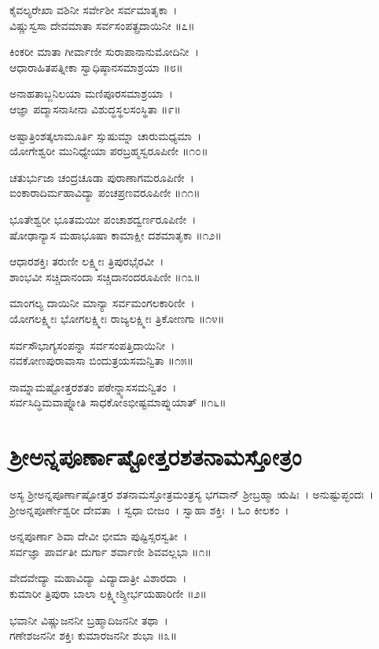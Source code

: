ಕೈವಲ್ಯರೇಖಾ ವಶಿನೀ ಸರ್ವೇಶೀ ಸರ್ವಮಾತೃಕಾ~।\\
ವಿಷ್ಣುಸ್ವಸಾ ದೇವಮಾತಾ ಸರ್ವಸಂಪತ್ಪ್ರದಾಯಿನೀ ॥೭॥

ಕಿಂಕರೀ ಮಾತಾ ಗೀರ್ವಾಣೀ ಸುರಾಪಾನಾನುಮೋದಿನೀ~।\\
ಆಧಾರಾಹಿತಪತ್ನೀಕಾ ಸ್ವಾಧಿಷ್ಠಾನಸಮಾಶ್ರಯಾ ॥೮॥

ಅನಾಹತಾಬ್ಜನಿಲಯಾ ಮಣಿಪೂರಸಮಾಶ್ರಯಾ~।\\
ಆಜ್ಞಾ ಪದ್ಮಾಸನಾಸೀನಾ ವಿಶುದ್ಧಸ್ಥಲಸಂಸ್ಥಿತಾ ॥೯॥

ಅಷ್ಟಾತ್ರಿಂಶತ್ಕಲಾಮೂರ್ತಿ ಸ್ಸುಷುಮ್ನಾ ಚಾರುಮಧ್ಯಮಾ~।\\
ಯೋಗೇಶ್ವರೀ ಮುನಿಧ್ಯೇಯಾ ಪರಬ್ರಹ್ಮಸ್ವರೂಪಿಣೀ ॥೧೦॥

ಚತುರ್ಭುಜಾ ಚಂದ್ರಚೂಡಾ ಪುರಾಣಾಗಮರೂಪಿಣೀ~।\\
ಐಂಕಾರಾದಿರ್ಮಹಾವಿದ್ಯಾ ಪಂಚಪ್ರಣವರೂಪಿಣೀ ॥೧೧॥

ಭೂತೇಶ್ವರೀ ಭೂತಮಯೀ ಪಂಚಾಶದ್ವರ್ಣರೂಪಿಣೀ~।\\
ಷೋಢಾನ್ಯಾಸ ಮಹಾಭೂಷಾ ಕಾಮಾಕ್ಷೀ ದಶಮಾತೃಕಾ ॥೧೨॥

ಆಧಾರಶಕ್ತಿಃ ತರುಣೀ ಲಕ್ಷ್ಮೀಃ ತ್ರಿಪುರಭೈರವೀ~।\\
ಶಾಂಭವೀ ಸಚ್ಚಿದಾನಂದಾ ಸಚ್ಚಿದಾನಂದರೂಪಿಣೀ ॥೧೩॥

ಮಾಂಗಲ್ಯ ದಾಯಿನೀ ಮಾನ್ಯಾ ಸರ್ವಮಂಗಲಕಾರಿಣೀ~।\\
ಯೋಗಲಕ್ಷ್ಮೀಃ ಭೋಗಲಕ್ಷ್ಮೀಃ ರಾಜ್ಯಲಕ್ಷ್ಮೀಃ ತ್ರಿಕೋಣಗಾ ॥೧೪॥

ಸರ್ವಸೌಭಾಗ್ಯಸಂಪನ್ನಾ ಸರ್ವಸಂಪತ್ತಿದಾಯಿನೀ~।\\
ನವಕೋಣಪುರಾವಾಸಾ ಬಿಂದುತ್ರಯಸಮನ್ವಿತಾ ॥೧೫॥

ನಾಮ್ನಾಮಷ್ಟೋತ್ತರಶತಂ ಪಠೇನ್ನ್ಯಾಸಸಮನ್ವಿತಂ~।\\
ಸರ್ವಸಿದ್ಧಿಮವಾಪ್ನೋತಿ ಸಾಧಕೋಽಭೀಷ್ಟಮಾಪ್ನುಯಾತ್ ॥೧೬॥
\section{ಶ್ರೀಅನ್ನಪೂರ್ಣಾಷ್ಟೋತ್ತರಶತನಾಮಸ್ತೋತ್ರಂ }
ಅಸ್ಯ ಶ್ರೀಅನ್ನಪೂರ್ಣಾಷ್ಟೋತ್ತರ ಶತನಾಮಸ್ತೋತ್ರಮಂತ್ರಸ್ಯ ಭಗವಾನ್ ಶ್ರೀಬ್ರಹ್ಮಾ ಋಷಿಃ~। ಅನುಷ್ಟುಪ್ಛಂದಃ~। ಶ್ರೀಅನ್ನಪೂರ್ಣೇಶ್ವರೀ ದೇವತಾ~। ಸ್ವಧಾ ಬೀಜಂ~। ಸ್ವಾಹಾ ಶಕ್ತಿಃ~। ಓಂ ಕೀಲಕಂ~।

ಅನ್ನಪೂರ್ಣಾ ಶಿವಾ ದೇವೀ ಭೀಮಾ ಪುಷ್ಟಿಸ್ಸರಸ್ವತೀ~।\\
ಸರ್ವಜ್ಞಾ ಪಾರ್ವತೀ ದುರ್ಗಾ ಶರ್ವಾಣೀ ಶಿವವಲ್ಲಭಾ ॥೧॥

ವೇದವೇದ್ಯಾ ಮಹಾವಿದ್ಯಾ ವಿದ್ಯಾದಾತ್ರೀ ವಿಶಾರದಾ~।\\
ಕುಮಾರೀ ತ್ರಿಪುರಾ ಬಾಲಾ ಲಕ್ಷ್ಮೀಶ್ಶ್ರೀರ್ಭಯಹಾರಿಣೀ ॥೨॥

ಭವಾನೀ ವಿಷ್ಣುಜನನೀ ಬ್ರಹ್ಮಾದಿಜನನೀ ತಥಾ~।\\
ಗಣೇಶಜನನೀ ಶಕ್ತಿಃ ಕುಮಾರಜನನೀ ಶುಭಾ ॥೩॥

